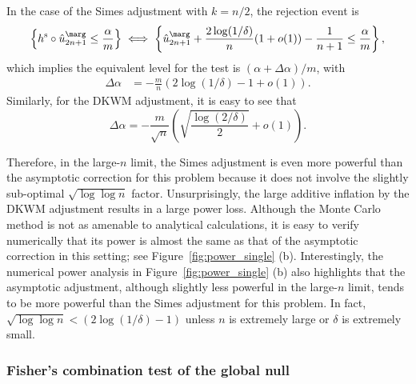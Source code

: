 In the case of the Simes adjustment with $k=n/2$, the rejection event is
\begin{align*}
   \left\{h^{\mathrm{s}} \circ \hat{u}^\marg_{2n+1} \leq \frac{\alpha}{m}\right\}
  \iff \left\{\hat{u}^\marg_{2n+1} + \frac{2 \log(1/\delta)}{n}(1 + o(1)) - \frac{1}{n+1} \leq \frac{\alpha}{m}\right\},
\end{align*}
which implies the equivalent level for the test is $(\alpha + \Delta \alpha)/m$, with
\begin{align*}
  \Delta \alpha
  & = - \frac{m}{n} \left(2\log(1/\delta)-1 + o(1)\right).
\end{align*}
Similarly, for the DKWM adjustment, it is easy to see that
\[\Delta \alpha = -\frac{m}{\sqrt{n}}\left(\sqrt{\frac{\log(2/\delta)}{2}} + o(1)\right).\]

Therefore, in the large-$n$ limit, the Simes adjustment is even more powerful than the asymptotic correction for this problem because it does not involve the slightly sub-optimal $\sqrt{\log \log n}$ factor. Unsurprisingly, the large additive inflation by the DKWM adjustment results in a large power loss.
Although the Monte Carlo method is not as amenable to analytical calculations, it is easy to verify numerically that its power is almost the same as that of the asymptotic correction in this setting; see Figure~\ref{fig:power_single} (b).
Interestingly, the numerical power analysis in Figure~\ref{fig:power_single} (b) also highlights that the asymptotic adjustment, although slightly less powerful in the large-$n$ limit, tends to be more powerful than the Simes adjustment for this problem. In fact, $\sqrt{\log \log n} < \left(2\log(1/\delta)-1\right)$ unless $n$ is extremely large or $\delta$ is extremely small.


\subsubsection{Fisher's combination test of the global null}


